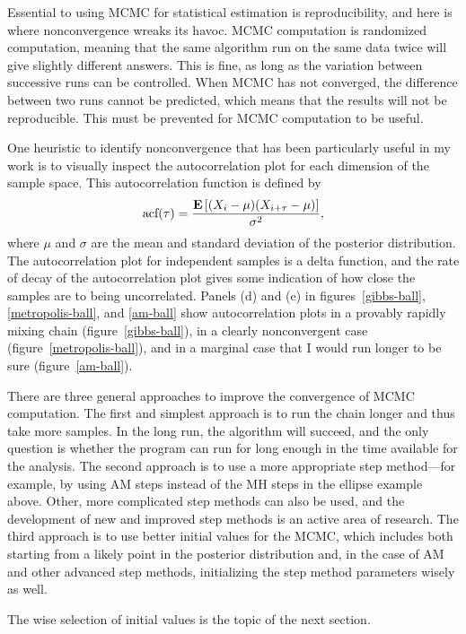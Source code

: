 Essential to using MCMC for statistical estimation is reproducibility,
and here is where nonconvergence wreaks its havoc.  MCMC computation
is randomized computation, meaning that the same algorithm run on the same
data twice will give slightly different answers.  This is fine, as
long as the variation between successive runs can be controlled.  When
MCMC has not converged, the difference between two runs cannot be
predicted, which means that the results will not be reproducible.  This
must be prevented for MCMC computation to be useful.

One heuristic to identify nonconvergence that has been particularly
useful in my work is to visually inspect the autocorrelation plot for
each dimension of the sample space.  This autocorrelation function is defined by
\[
\text{acf}(\tau) = \frac{\mathbf{E}\left[(X_i - \mu)(X_{i+\tau} - \mu)\right]}{\sigma^2},
\]
where $\mu$ and $\sigma$ are the mean and standard deviation of the
posterior distribution.  The autocorrelation plot for independent
samples is a delta function, and the rate of decay of the
autocorrelation plot gives some indication of how close the samples
are to being uncorrelated.  Panels (d) and (e) in
figures~\ref{gibbs-ball}, \ref{metropolis-ball}, and \ref{am-ball}
show autocorrelation plots in a provably rapidly mixing chain
(figure~\ref{gibbs-ball}), in a clearly nonconvergent case
(figure~\ref{metropolis-ball}), and in a marginal case that I would
run longer to be sure (figure~\ref{am-ball}).

There are three general approaches to improve the convergence of MCMC
computation. The first and simplest approach is to run the chain
longer and thus take more samples.  In the long run, the algorithm
will succeed, and the only question is whether the program can run for long
enough in the time available for the analysis. The second approach is
to use a more appropriate step method---for example, by using AM steps
instead of the MH steps in the ellipse example above.  Other, more
complicated step methods can also be used, and the development of new
and improved step methods is an active area of research.  The third
approach is to use better initial values for the MCMC, which includes
both starting from a likely point in the posterior distribution and,
in the case of AM and other advanced step methods, initializing the
step method parameters wisely as well.

The wise selection of initial values is the topic of the next section.

